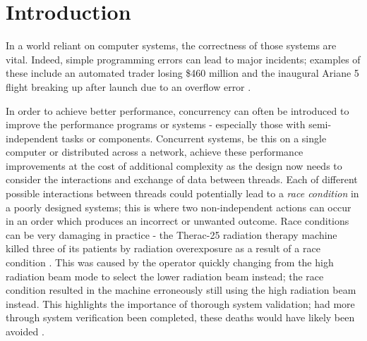 \section{Introduction}


In a world reliant on computer systems, the correctness of those systems are vital. Indeed, simple programming errors can lead to major incidents; examples of these include an automated trader losing \$460 million \cite{KnightCapital} and the inaugural Ariane 5 flight breaking up after launch due to an overflow error \cite{Flight501Failure}. 

In order to achieve better performance, concurrency can often be introduced to improve the performance programs or systems - especially those with semi-independent tasks or components.
Concurrent systems, be this on a single computer or distributed across a network, achieve these performance improvements at the cost of additional complexity as the design now needs to consider the interactions and exchange of data between threads. 
Each of different possible interactions between threads could potentially lead to a \emph{race condition} in a poorly designed systems; this is where two non-independent actions can occur in an order which produces an incorrect or unwanted outcome. 
Race conditions can be very damaging in practice - the Therac-25 radiation therapy machine killed three of its patients by radiation overexposure as a result of a race condition \cite{BugSnag}. This was caused by the operator quickly changing from the high radiation beam mode to select the lower radiation beam instead; the race condition resulted in the machine erroneously still using the high radiation beam instead. This highlights the importance of thorough system validation; had more through system verification been completed, these deaths would have likely been avoided \cite{AGift}.



